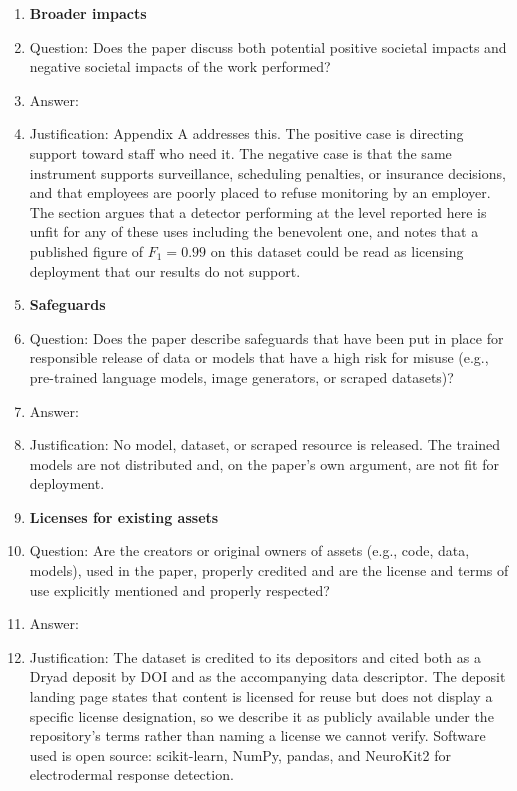 \begin{enumerate}
\item {\bf Broader impacts}
    \item[] Question: Does the paper discuss both potential positive societal impacts and negative societal impacts of the work performed?
    \item[] Answer: \answerYes{}
    \item[] Justification: Appendix A addresses this. The positive case is directing support toward staff who need it. The negative case is that the same instrument supports surveillance, scheduling penalties, or insurance decisions, and that employees are poorly placed to refuse monitoring by an employer. The section argues that a detector performing at the level reported here is unfit for any of these uses including the benevolent one, and notes that a published figure of $F_1 = 0.99$ on this dataset could be read as licensing deployment that our results do not support.

\item {\bf Safeguards}
    \item[] Question: Does the paper describe safeguards that have been put in place for responsible release of data or models that have a high risk for misuse (e.g., pre-trained language models, image generators, or scraped datasets)?
    \item[] Answer: \answerNA{}
    \item[] Justification: No model, dataset, or scraped resource is released. The trained models are not distributed and, on the paper's own argument, are not fit for deployment.

\item {\bf Licenses for existing assets}
    \item[] Question: Are the creators or original owners of assets (e.g., code, data, models), used in the paper, properly credited and are the license and terms of use explicitly mentioned and properly respected?
    \item[] Answer: \answerYes{}
    \item[] Justification: The dataset is credited to its depositors and cited both as a Dryad deposit by DOI and as the accompanying data descriptor. The deposit landing page states that content is licensed for reuse but does not display a specific license designation, so we describe it as publicly available under the repository's terms rather than naming a license we cannot verify. Software used is open source: scikit-learn, NumPy, pandas, and NeuroKit2 for electrodermal response detection.


\end{enumerate}
